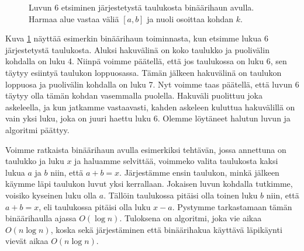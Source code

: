 \begin{figure}
\center
{}
\caption{Luvun 6 etsiminen järjestetystä taulukosta binäärihaun avulla.
Harmaa alue vastaa väliä $[a,b]$ ja nuoli osoittaa kohdan $k$.}
\label{fig:binhak}
\end{figure}

Kuva \ref{fig:binhak} näyttää esimerkin binäärihaun toiminnasta,
kun etsimme lukua 6 järjestetystä taulukosta.
Aluksi hakuvälinä on koko taulukko ja puolivälin kohdalla
on luku 4.
Niinpä voimme päätellä, että jos taulukossa on luku 6,
sen täytyy esiintyä taulukon loppuosassa.
Tämän jälkeen hakuvälinä on taulukon loppuosa ja
puolivälin kohdalla on luku 7.
Nyt voimme taas päätellä, että luvun 6 täytyy olla
tämän kohdan vasemmalla puolella.
Hakuväli puolittuu joka askeleella,
ja kun jatkamme vastaavasti, kahden askeleen kuluttua
hakuvälillä on vain yksi luku, joka on juuri haettu luku 6.
Olemme löytäneet halutun luvun ja algoritmi päättyy.

Voimme ratkaista binäärihaun avulla esimerkiksi tehtävän,
jossa annettuna on taulukko ja luku $x$ ja haluamme selvittää,
voimmeko valita taulukosta kaksi lukua $a$ ja $b$ niin, että $a+b=x$.
Järjestämme ensin taulukon, minkä jälkeen käymme läpi taulukon
luvut yksi kerrallaan.
Jokaisen luvun kohdalla tutkimme, voisiko kyseinen luku olla $a$.
Tällöin taulukossa pitäisi olla toinen luku $b$ niin, että
$a+b=x$, eli taulukossa pitäisi olla luku $x-a$.
Pystymme tarkastamaan tämän binäärihaulla ajassa $O(\log n)$.
Tuloksena on algoritmi, joka vie aikaa $O(n \log n)$,
koska sekä järjestäminen että binäärihakua käyttävä läpikäynti
vievät aikaa $O(n \log n)$.
